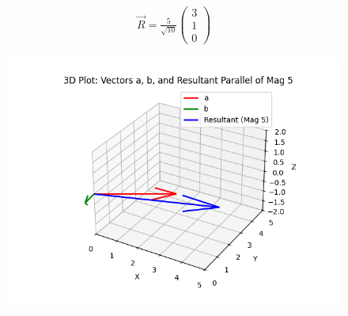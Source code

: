 \documentclass[journal]{IEEEtran}
\begin{document}
\begin{align}
\boxed{
\vec{R} = \frac{5}{\sqrt{10}}
\begin{pmatrix}
3 \\
1 \\
0
\end{pmatrix}
}
\end{align}




\begin{figure}[H]
\begin{center}
\includegraphics[width=0.75\columnwidth]{figs/graph.png}
\end{center}
\caption{}
\label{fig:Fig}
\end{figure}
\end{document}

